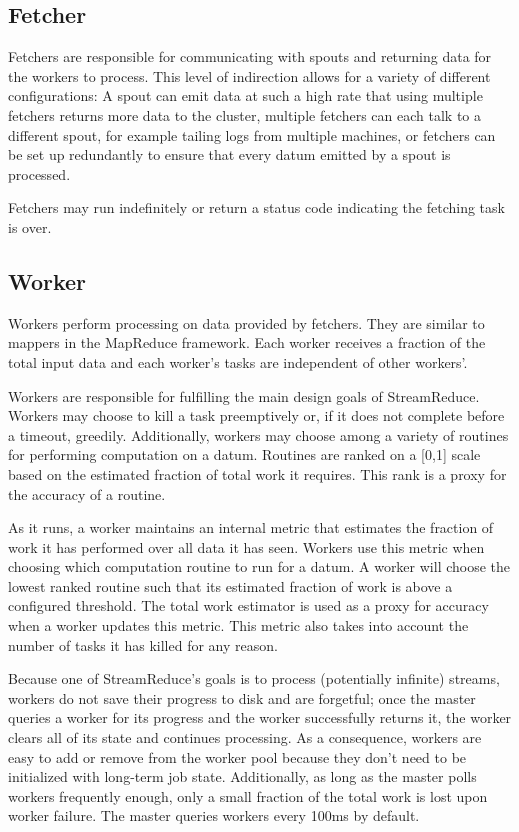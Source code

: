 \documentclass[12pt,twocolumn]{article}
\begin{document}
\subsection{Fetcher}
Fetchers are responsible for communicating with spouts and returning data for the
workers to process. This level of indirection allows for a variety of different
configurations: A spout can emit data at such a high rate that using multiple fetchers
returns more data to the cluster, multiple fetchers can each talk to a different spout,
for example tailing logs from multiple machines, or fetchers can be set up redundantly
to ensure that every datum emitted by a spout is processed.

Fetchers may run indefinitely or return a status code indicating
the fetching task is over.
\subsection{Worker}
Workers perform processing on data provided by fetchers. They are similar to mappers
in the MapReduce framework. Each worker receives a fraction of the total input data
and each worker's tasks are independent of other workers'.

Workers are responsible for fulfilling the main design goals of StreamReduce. Workers may
choose
to kill a task preemptively or, if it does not complete before a timeout, greedily. Additionally,
workers may choose among a variety of routines for performing computation on a datum.
Routines are ranked on a [0,1] scale based on the estimated fraction of total work it
requires. This rank is a proxy for the accuracy of a routine.

As it runs, a worker maintains an internal metric that estimates the fraction of work
it has performed over all data it has seen. Workers use this metric when choosing which
computation routine to run for a datum. A worker will choose the lowest ranked routine
such that its estimated fraction of work is above a configured threshold.
The total work estimator is used as a proxy for accuracy when a worker updates
this metric. This metric also takes into account the number of tasks it has killed
for any reason.

Because one of StreamReduce's goals is to process (potentially infinite) streams, workers do
not
save their progress to disk and are forgetful; once the master queries a worker for its
progress and the worker successfully returns it, the worker clears all of its state and
continues processing. As a consequence, workers are easy to add or remove from the worker
pool because they don't need to be initialized with long-term job state. Additionally, as
long as the master polls workers frequently enough, only a small
fraction of the total work is lost upon worker failure.
The master queries workers every 100ms by default.
\end{document}

